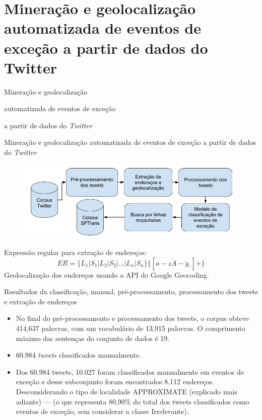 \documentclass{beamer}
\begin{document}
\section{Mineração e geolocalização automatizada de eventos de exceção a partir de dados do Twitter}
\begin{frame}
\Huge{\centerline{Mineração e geolocalização}}
\Huge{\centerline{automatizada de eventos de exceção}}
\Huge{\centerline{a partir de dados do \textit{Twitter}}}
\end{frame}
\begin{frame}{Mineração e geolocalização automatizada de eventos de exceção a partir de dados do \textit{Twitter}}
    \begin{figure}[!htb]%
	\centering
		\includegraphics[width=1\linewidth]{tweet_based_methodology_pt.png}
	\label{fig:pizza_bus}
\end{figure}
Expressão regular para extração de endereços:
\begin{equation}
ER = \lbrace L_1 | S_1 | L_2 | S_2 | \dots | L_n | S_n \rbrace \lbrace [a-z\grave{A}-\ddot{y}\_] + \rbrace
\end{equation}
Geolocalização dos endereços usando a API do Google Geocoding.
\end{frame}
\begin{frame}{Resultados da classificação, manual, pré-processamento, processamento dos tweets e extração de endereços}
\begin{itemize}
    \item No final do pré-processamento e processamento dos tweets, o corpus obteve 414,637 palavras, com um vocabulário de 13,915 palavras. O comprimento máximo das sentenças do conjunto de dados é 19.
    \item 60.984 \textit{tweets} classificados manualmente.
    \item Dos 60.984 tweets, 10.027 foram classificados manualmente em eventos de exceção e desse subconjunto foram encontrados 8.112 endereços. Desconsiderando o tipo de localidade APPROXIMATE (explicado mais adiante) --- (o que representa 80,90\% do total dos tweets classificados como eventos de exceção, sem considerar a classe Irrelevante).
\end{itemize}
\end{frame}
\end{document}
